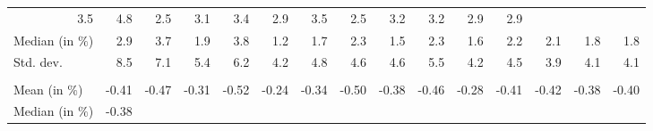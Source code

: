 \begin{tabular}{lllllllllllllll}
  \multicolumn{1}{r}{3.5} &
  \multicolumn{1}{r}{4.8} &
  \multicolumn{1}{r}{2.5} &
  \multicolumn{1}{r}{3.1} &
  \multicolumn{1}{r}{3.4} &
  \multicolumn{1}{r}{2.9} &
  \multicolumn{1}{r}{3.5} &
  \multicolumn{1}{r}{2.5} &
  \multicolumn{1}{r}{3.2} &
  \multicolumn{1}{r}{3.2} &
  \multicolumn{1}{r}{2.9} &
  \multicolumn{1}{r}{2.9} \\
\multicolumn{1}{l}{\hspace{2em}Median (in $\%$)} &
  \multicolumn{1}{|r}{2.9} &
  \multicolumn{1}{r}{3.7} &
  \multicolumn{1}{r}{1.9} &
  \multicolumn{1}{r}{3.8} &
  \multicolumn{1}{r}{1.2} &
  \multicolumn{1}{r}{1.7} &
  \multicolumn{1}{r}{2.3} &
  \multicolumn{1}{r}{1.5} &
  \multicolumn{1}{r}{2.3} &
  \multicolumn{1}{r}{1.6} &
  \multicolumn{1}{r}{2.2} &
  \multicolumn{1}{r}{2.1} &
  \multicolumn{1}{r}{1.8} &
  \multicolumn{1}{r}{1.8} \\
\multicolumn{1}{l}{\hspace{2em}Std. dev.} &
  \multicolumn{1}{|r}{8.5} &
  \multicolumn{1}{r}{7.1} &
  \multicolumn{1}{r}{5.4} &
  \multicolumn{1}{r}{6.2} &
  \multicolumn{1}{r}{4.2} &
  \multicolumn{1}{r}{4.8} &
  \multicolumn{1}{r}{4.6} &
  \multicolumn{1}{r}{4.6} &
  \multicolumn{1}{r}{5.5} &
  \multicolumn{1}{r}{4.2} &
  \multicolumn{1}{r}{4.5} &
  \multicolumn{1}{r}{3.9} &
  \multicolumn{1}{r}{4.1} &
  \multicolumn{1}{r}{4.1} \\
\multicolumn{1}{l}{\hspace{1em}{\textit{Elasticity} ($\widehat{\beta}$)}} &
  \multicolumn{1}{|r}{} &
  \multicolumn{1}{r}{} &
  \multicolumn{1}{r}{} &
  \multicolumn{1}{r}{} &
  \multicolumn{1}{r}{} &
  \multicolumn{1}{r}{} &
  \multicolumn{1}{r}{} &
  \multicolumn{1}{r}{} &
  \multicolumn{1}{r}{} &
  \multicolumn{1}{r}{} &
  \multicolumn{1}{r}{} &
  \multicolumn{1}{r}{} &
  \multicolumn{1}{r}{} &
  \multicolumn{1}{r}{} \\
\multicolumn{1}{l}{\hspace{2em}Mean (in $\%$)} &
  \multicolumn{1}{|r}{-0.41} &
  \multicolumn{1}{r}{-0.47} &
  \multicolumn{1}{r}{-0.31} &
  \multicolumn{1}{r}{-0.52} &
  \multicolumn{1}{r}{-0.24} &
  \multicolumn{1}{r}{-0.34} &
  \multicolumn{1}{r}{-0.50} &
  \multicolumn{1}{r}{-0.38} &
  \multicolumn{1}{r}{-0.46} &
  \multicolumn{1}{r}{-0.28} &
  \multicolumn{1}{r}{-0.41} &
  \multicolumn{1}{r}{-0.42} &
  \multicolumn{1}{r}{-0.38} &
  \multicolumn{1}{r}{-0.40} \\
\multicolumn{1}{l}{\hspace{2em}Median (in $\%$)} &
  \multicolumn{1}{|r}{-0.38} &

\end{tabular}
